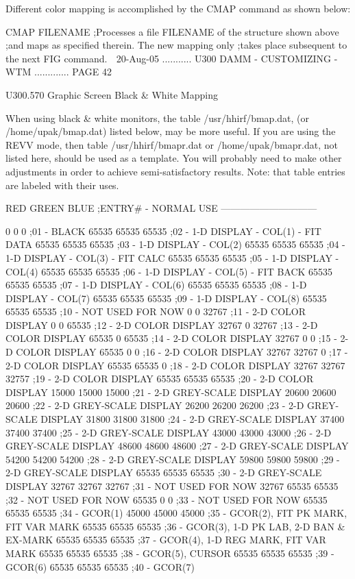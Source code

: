    Different color mapping is accomplished by the CMAP command as shown below:
 
   CMAP FILENAME  ;Processes a file FILENAME of the structure shown above
                  ;and maps as  specified  therein.  The new mapping only
                  ;takes place subsequent to the next FIG command.
    
   20-Aug-05 ........... U300  DAMM - CUSTOMIZING - WTM ............. PAGE  42
 
   U300.570  Graphic Screen Black & White Mapping
 
   When  using  black  &  white  monitors,  the table /usr/hhirf/bmap.dat, (or
   /home/upak/bmap.dat) listed below, may be more useful.  If  you  are  using
   the  REVV  mode,  then  table /usr/hhirf/bmapr.dat or /home/upak/bmapr.dat,
   not listed here, should be used as a template. You will  probably  need  to
   make  other  adjustments  in  order  to  achieve semi-satisfactory results.
   Note: that table entries are labeled with their uses.
 
       RED  GREEN   BLUE   ;ENTRY# - NORMAL USE ------------------------------
 
         0      0      0  ;01 - BLACK
     65535  65535  65535  ;02 - 1-D DISPLAY - COL(1) - FIT DATA
     65535  65535  65535  ;03 - 1-D DISPLAY - COL(2)
     65535  65535  65535  ;04 - 1-D DISPLAY - COL(3) - FIT CALC
     65535  65535  65535  ;05 - 1-D DISPLAY - COL(4)
     65535  65535  65535  ;06 - 1-D DISPLAY - COL(5) - FIT BACK
     65535  65535  65535  ;07 - 1-D DISPLAY - COL(6)
     65535  65535  65535  ;08 - 1-D DISPLAY - COL(7)
     65535  65535  65535  ;09 - 1-D DISPLAY - COL(8)
     65535  65535  65535  ;10 - NOT USED FOR NOW
         0      0  32767  ;11 - 2-D COLOR DISPLAY
         0      0  65535  ;12 - 2-D COLOR DISPLAY
     32767      0  32767  ;13 - 2-D COLOR DISPLAY
     65535      0  65535  ;14 - 2-D COLOR DISPLAY
     32767      0      0  ;15 - 2-D COLOR DISPLAY
     65535      0      0  ;16 - 2-D COLOR DISPLAY
     32767  32767      0  ;17 - 2-D COLOR DISPLAY
     65535  65535      0  ;18 - 2-D COLOR DISPLAY
     32767  32767  32757  ;19 - 2-D COLOR DISPLAY
     65535  65535  65535  ;20 - 2-D COLOR DISPLAY
     15000  15000  15000  ;21 - 2-D GREY-SCALE DISPLAY
     20600  20600  20600  ;22 - 2-D GREY-SCALE DISPLAY
     26200  26200  26200  ;23 - 2-D GREY-SCALE DISPLAY
     31800  31800  31800  ;24 - 2-D GREY-SCALE DISPLAY
     37400  37400  37400  ;25 - 2-D GREY-SCALE DISPLAY
     43000  43000  43000  ;26 - 2-D GREY-SCALE DISPLAY
     48600  48600  48600  ;27 - 2-D GREY-SCALE DISPLAY
     54200  54200  54200  ;28 - 2-D GREY-SCALE DISPLAY
     59800  59800  59800  ;29 - 2-D GREY-SCALE DISPLAY
     65535  65535  65535  ;30 - 2-D GREY-SCALE DISPLAY
     32767  32767  32767  ;31 - NOT USED FOR NOW
     32767  65535  65535  ;32 - NOT USED FOR NOW
     65535      0      0  ;33 - NOT USED FOR NOW
     65535  65535  65535  ;34 - GCOR(1)
     45000  45000  45000  ;35 - GCOR(2), FIT PK MARK,  FIT VAR MARK
     65535  65535  65535  ;36 - GCOR(3), 1-D PK LAB, 2-D BAN & EX-MARK
     65535  65535  65535  ;37 - GCOR(4), 1-D REG MARK, FIT VAR MARK
     65535  65535  65535  ;38 - GCOR(5), CURSOR
     65535  65535  65535  ;39 - GCOR(6)
     65535  65535  65535  ;40 - GCOR(7)

